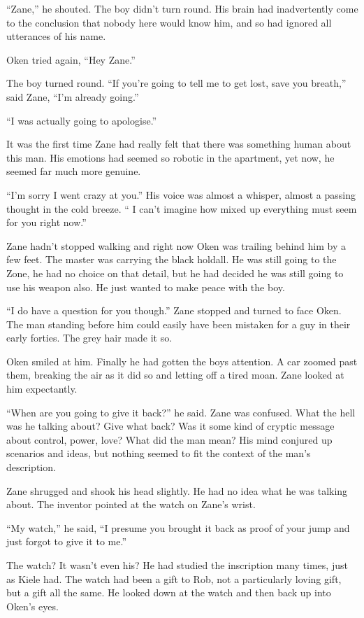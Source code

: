 ``Zane,'' he shouted.  The boy didn't turn round.  His brain had inadvertently come to the conclusion that nobody here would know him, and so had ignored all utterances of his name.

Oken tried again, ``Hey Zane.''

The boy turned round.  ``If you're going to tell me to get lost, save you breath,'' said Zane, ``I'm already going.''

``I was actually going to apologise.''  

It was the first time Zane had really felt that there was something human about this man.  His emotions had seemed so robotic in the apartment, yet now, he seemed far much more genuine.

``I'm sorry I went crazy at you.''  His voice was almost a whisper, almost a passing thought in the cold breeze.  `` I can't imagine how mixed up everything must seem for you right now.''  

Zane hadn't stopped walking and right now Oken was trailing behind him by a few feet.  The master was carrying the black holdall.  He was still going to the Zone, he had no choice on that detail, but he had decided he was still going to use his weapon also.  He just wanted to make peace with the boy.

``I do have a question for you though.''  Zane stopped and turned to face Oken.  The man standing before him could easily have been mistaken for a guy in their early forties.  The grey hair made it so.  

Oken smiled at him.  Finally he had gotten the boys attention.  A car zoomed past them, breaking the air as it did so and letting off a tired moan.  Zane looked at him expectantly.

``When are you going to give it back?'' he said.  Zane was confused.  What the hell was he talking about?  Give what back?  Was it some kind of cryptic message about control, power, love?  What did the man mean?  His mind conjured up scenarios and ideas, but nothing seemed to fit the context of the man's description.

Zane shrugged and shook his head slightly.  He had no idea what he was talking about.  The inventor pointed at the watch on Zane's wrist.  

``My watch,'' he said, ``I presume you brought it back as proof of your jump and just forgot to give it to me.''  

The watch?  It wasn't even his?  He had studied the inscription many times, just as Kiele had.  The watch had been a gift to Rob, not a particularly loving gift, but a gift all the same.  He looked down at the watch and then back up into Oken's eyes.

